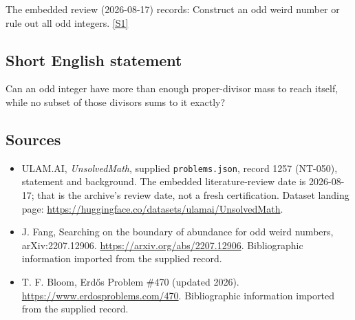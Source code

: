 \documentclass[11pt,a4paper]{article}
\newcommand{\sref}[2]{\hyperlink{source:#1:#2}{[S#2]}}
\begin{document}
The embedded review (2026-08-17) records: Construct an odd weird number or rule out all odd integers. \sref{1257}{1}

\subsection{Short English statement}

Can an odd integer have more than enough proper-divisor mass to reach itself, while no subset of those divisors sums to it exactly?

\subsection{Sources}

{\small

\begin{itemize}

\item[\hypertarget{source:1257:1}{S1}] ULAM.AI, \emph{UnsolvedMath}, supplied \texttt{problems.json}, record 1257 (NT-050), statement and background. The embedded literature-review date is 2026-08-17; that is the archive’s review date, not a fresh certification. Dataset landing page: \url{https://huggingface.co/datasets/ulamai/UnsolvedMath}.

\item[\hypertarget{source:1257:2}{S2}] J. Fang, Searching on the boundary of abundance for odd weird numbers, arXiv:2207.12906. \url{https://arxiv.org/abs/2207.12906}. Bibliographic information imported from the supplied record.

\item[\hypertarget{source:1257:3}{S3}] T. F. Bloom, Erdős Problem \#470 (updated 2026). \url{https://www.erdosproblems.com/470}. Bibliographic information imported from the supplied record.

\end{itemize}

}

\label{end:1257}
\end{document}
